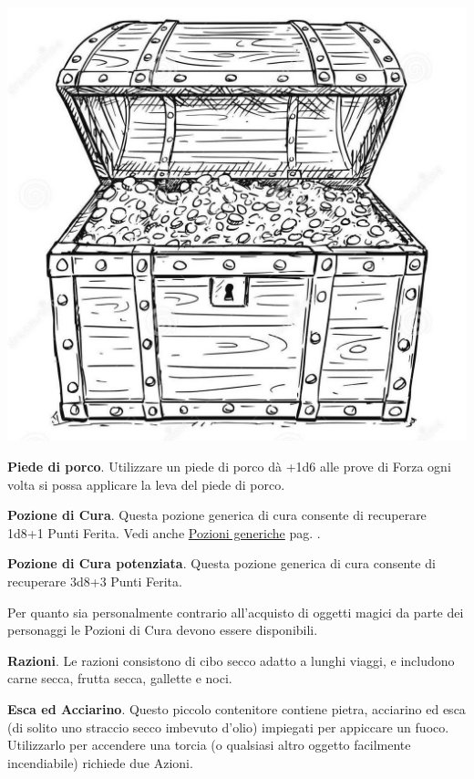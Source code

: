 \begin{multicols}{2}
\begin{center}
	\includegraphics[width=0.7\linewidth]{immagini/forziere.png}
\end{center}

\textbf{Piede di porco}. Utilizzare un piede di porco dà +1d6 alle prove di Forza ogni volta si possa applicare la leva del piede di porco.\hypertarget{piedediporco}{}\label{piedediporco}

\textbf{Pozione di Cura}\hypertarget{Equip Pozione di Cura}{}. Questa pozione generica di cura consente di recuperare 1d8+1 Punti Ferita. Vedi anche \hyperlink{pozionigeneriche}{Pozioni generiche} pag. \pageref{pozionigeneriche}.

\textbf{Pozione di Cura potenziata}\label{Pozione di Cura potenziata}\hypertarget{Equip Pozione di Cura potenziata}{}. Questa pozione generica di cura consente di recuperare 3d8+3 Punti Ferita.

\begin{narratore}
Per quanto sia personalmente contrario all'acquisto di oggetti magici da parte dei personaggi le Pozioni di Cura devono essere disponibili.
\end{narratore}

\textbf{Razioni}\hypertarget{Razioni}{}\label{Razioni}. Le razioni consistono di cibo secco adatto a lunghi viaggi, e includono carne secca, frutta secca, gallette e noci.

\textbf{Esca ed Acciarino}\label{Esca ed Acciarino}\hypertarget{Esca ed Acciarino}{}. Questo piccolo contenitore contiene pietra, acciarino ed esca (di solito uno straccio secco imbevuto d'olio) impiegati per appiccare un fuoco. Utilizzarlo per accendere una torcia (o qualsiasi altro oggetto facilmente incendiabile) richiede due Azioni.


\end{multicols}
